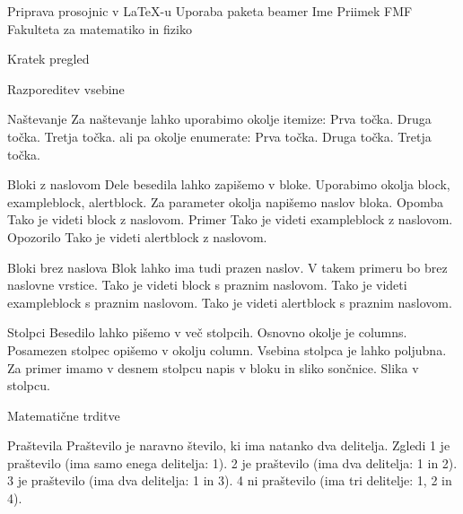 

Priprava prosojnic v LaTeX-u
Uporaba paketa beamer
Ime Priimek
FMF Fakulteta za matematiko in fiziko


   Kratek pregled


Razporeditev vsebine


   Naštevanje
   Za naštevanje lahko uporabimo okolje itemize:
      Prva točka.
      Druga točka.
      Tretja točka.
   ali pa okolje enumerate:
      Prva točka.
      Druga točka.
      Tretja točka.


   Bloki z naslovom
   Dele besedila lahko zapišemo v bloke.
   Uporabimo okolja block, exampleblock, alertblock.
   Za parameter okolja napišemo naslov bloka.
   Opomba
      Tako je videti block z naslovom.
   Primer
      Tako je videti exampleblock z naslovom.
   Opozorilo
      Tako je videti alertblock z naslovom.


   Bloki brez naslova
   Blok lahko ima tudi prazen naslov.
   V takem primeru bo brez naslovne vrstice.
      Tako je videti block s praznim naslovom.
      Tako je videti exampleblock s praznim naslovom.
      Tako je videti alertblock s praznim naslovom.


   Stolpci
            Besedilo lahko pišemo v več stolpcih.
            Osnovno okolje je columns.
            Posamezen stolpec opišemo v okolju column.
            Vsebina stolpca je lahko poljubna.
            Za primer imamo v desnem stolpcu napis v bloku in sliko sončnice.
            Slika v stolpcu.


Matematične trditve


   Praštevila
      Praštevilo je naravno število, ki ima natanko dva delitelja.
   Zgledi
         1 je praštevilo (ima samo enega delitelja: 1).
         2 je praštevilo (ima dva delitelja: 1 in 2).
         3 je praštevilo (ima dva delitelja: 1 in 3).
         4 ni praštevilo (ima tri delitelje: 1, 2 in 4).

